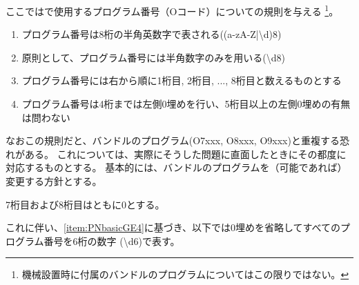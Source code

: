 

ここでは\DMC で使用するプログラム番号（Oコード）についての規則を与える
\footnote{機械設置時に付属のバンドルのプログラムについてはこの限りではない。}。



\begin{enumerate}[label=\Roman*., ref=\Roman*]
\item プログラム番号は8桁の半角英数字で表される({\ttfamily(a-zA-Z|\textbackslash d){8}})
\item 原則として、プログラム番号には半角数字のみを用いる({\ttfamily\textbackslash d{8}})
\item プログラム番号には右から順に1桁目, 2桁目, ..., 8桁目と数えるものとする
\item\label{item:PNbasicGE4}プログラム番号は4桁までは左側0埋めを行い、5桁目以上の左側0埋めの有無は問わない
\end{enumerate}
\begin{hosoku}
なおこの規則だと、バンドルのプログラム(O7xxx, O8xxx, O9xxx)と重複する恐れがある。
これについては、実際にそうした問題に直面したときにその都度に対応するものとする。
基本的には、バンドルのプログラムを（可能であれば）変更する方針とする。
\end{hosoku}


7桁目および8桁目はともに0とする。

これに伴い、\ref{item:PNbasicGE4}に基づき、以下では0埋めを省略してすべてのプログラム番号を6桁の数字 ({\ttfamily\textbackslash d{6}})で表す。


